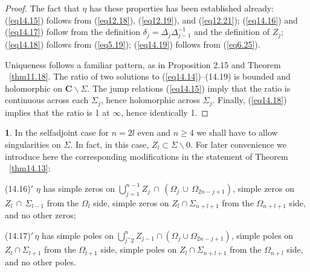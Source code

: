 \documentclass{surv-l}
\theoremstyle{plain}
\theoremstyle{definition}
\newtheorem{remark}[theorem]{\sc{Remark}}
\numberwithin{equation}{chapter}
\begin{document}
\begin{proof}The fact that $\eta$ has these properties has been established already: (\ref{eq14.15}) follows from (\ref{eq12.18}), (\ref{eq12.19}), and (\ref{eq12.21}); (\ref{eq14.16}) and (\ref{eq14.17}) follow from the definition $\delta_{j}=\Delta_{j}\Delta_{j-1}^{-1}$ and the definition of $Z_{j}$; (\ref{eq14.18}) follows from (\ref{eq5.19}); (\ref{eq14.19}) follows from (\ref{eq6.25}).

Uniqueness follows a familiar pattern, as in Proposition 2.15 and Theorem ~\ref{thm11.18}. The ratio of two solutions to (\ref{eq14.14})--(14.19) is bounded and holomorphic on $ \mathbf{C}\backslash \Sigma$. The jump relations (\ref{eq14.15}) imply that the ratio is continuous across each $\Sigma_{j}$, hence holomorphic across $\Sigma_{j}$. Finally, (\ref{eq14.18}) implies that the ratio is 1 at $\infty$, hence identically 1.
\end{proof}
\setcounter{theorem}{19}
\begin{remark}\label{rem14.20}In the selfadjoint case for $n=2l$ even and $n\geq 4$ we shall have to allow singularities on $\Sigma$. In fact, in this case, $Z_{l}\subset\Sigma\backslash 0$. For later convenience we introduce here the corresponding modifications in the statement of Theorem ~\ref{thm14.13}:

(14.16)$'$  $\eta$ has simple zeros on $\bigcup_{j=1}^{n-1}Z_{j}\,\cap\,(\Omega_{j}\,\cup\,\Omega_{2n-j+1})$, simple zeros on $Z_{l}\,\cap\,\Sigma_{l-1}$ from the $\Omega_{l}$ side, simple zeros on $Z_{l}\cap\Sigma_{n+l+1}$ from the $\Omega_{n+l+1}$ side, and no other zeros;

(14.17)$'\,\eta$ has simple poles on $\bigcup_{j^=2}^{n}Z_{j-1}\cap(\Omega_{j}\cup\Omega_{2n-j+1})$, simple poles on $Z_{l}\cap\Sigma_{l+1}$ from the $\Omega_{l+1}$ side, simple poles on $Z_{l}\cap\Sigma_{n+l+1}$ from the $\Omega_{n+l}$ side, and no other poles.
\end{remark}
\end{document}
